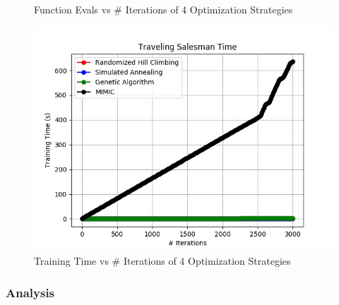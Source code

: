 \documentclass[h]{article}
\begin{document}
\begin{figure}[H]
      \caption*{Function Evals vs # Iterations of 4 Optimization Strategies} 
   \endminipage\hfill
      \includegraphics[width=1\textwidth,keepaspectratio]{traveling_salesman_time.jpg} 
      \caption*{Training Time vs # Iterations of 4 Optimization Strategies} 
   \endminipage\hfill
\end{figure}

\subsubsection*{Analysis}
\end{document}
